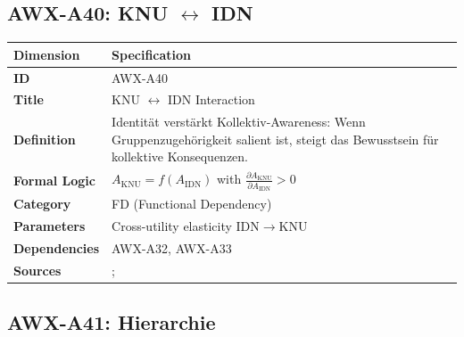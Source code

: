 
\subsection{AWX-A40: KNU $\leftrightarrow$ IDN}

\begin{table}[htbp]
\small
\begin{tabular}{p{3cm}p{11cm}}
\toprule
\textbf{Dimension} & \textbf{Specification} \\
\midrule
\textbf{ID} & AWX-A40 \\
\textbf{Title} & KNU $\leftrightarrow$ IDN Interaction \\
\textbf{Definition} & Identität verstärkt Kollektiv-Awareness: Wenn Gruppenzugehörigkeit salient ist, steigt das Bewusstsein für kollektive Konsequenzen. \\
\textbf{Formal Logic} & $A_{\text{KNU}} = f(A_{\text{IDN}})$ with $\frac{\partial A_{\text{KNU}}}{\partial A_{\text{IDN}}} > 0$ \\
\textbf{Category} & FD (Functional Dependency) \\
\textbf{Parameters} & Cross-utility elasticity IDN$\rightarrow$KNU \\
\textbf{Dependencies} & AWX-A32, AWX-A33 \\
\textbf{Sources} & \citet{PAP-akerlof2000identity}; \citet{tajfel1979integrative} \\
\bottomrule
\end{tabular}
\end{table}


\subsection{AWX-A41: Hierarchie}

